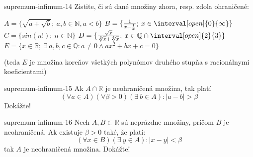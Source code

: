 \begin{defproblem}{supremum-infimum-14}
Zistite, či sú dané množiny zhora, resp. zdola ohraničené:
\begin{tasks}
  \task $A = \{ \sqrt{a + \sqrt{b}} ; \: a, b \in \mathbb{N}, a < b \}$
  \task $B = \{ \frac{1}{x + \frac{1}{x}} ; \: x \in \interval[open]{0}{\infty} \}$
  \task $C = \{ sin(n!) ; \: n \in \mathbb{N} \}$
  \task $D = \{ \frac{\sqrt{x}}{\sqrt[3]{x} + \sqrt[4]{x}}; \:
              x \in \mathbb{Q} \cap \interval[open]{2}{3} \}$
  \task $E = \{ x \in \mathbb{R}; \: \exists \: a, b, c \in \mathbb{Q}:
                a \neq 0 \land ax^2 + bx +c = 0 \}$

        (teda $E$ je množina koreňov všetkých polynómov druhého stupňa s
        racionálnymi koeficientami)
\end{tasks}
\end{defproblem}

\begin{defproblem}{supremum-infimum-15}
Ak $A \cap \mathbb{R}$ je neohraničená množina, tak platí
\[
(\forall a \in A) (\forall \beta > 0) (\exists \: b \in A): |a - b| > \beta
\]
Dokážte!
\end{defproblem}

\begin{defproblem}{supremum-infimum-16}
Nech $A, B \subset \mathbb{R}$ sú neprázdne množiny, pričom $B$ je
neohraničená. Ak existuje $\beta > 0$ také, že platí:
\[
(\forall x \in B) (\exists \: y \in A): |x - y| < \beta
\]
tak $A$ je neohraničená množina. Dokážte!
\end{defproblem}

